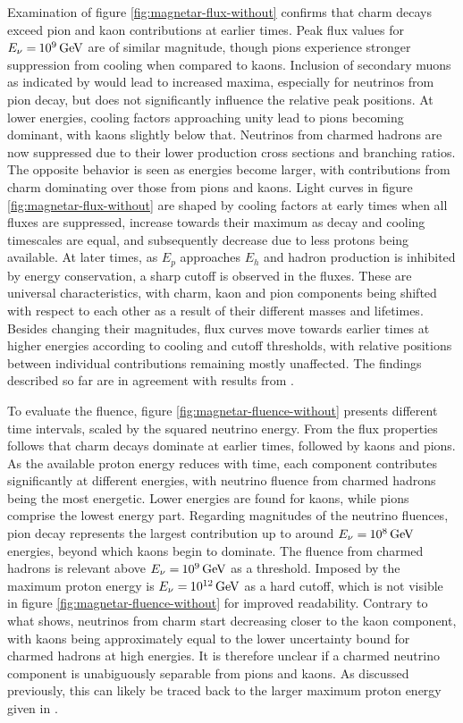 Examination of figure \ref{fig:magnetar-flux-without} confirms that charm decays exceed pion and kaon contributions at earlier times.
Peak flux values for $E_\nu = \kern-0.5pt \qty{e9}{\giga\electronvolt}$ are of similar magnitude, though pions experience stronger
suppression from cooling when compared to kaons. Inclusion of secondary muons as indicated by \cite{Carpio_2020} would
lead to increased maxima, especially for neutrinos from pion decay, but does not significantly influence the relative peak positions.
At lower energies, cooling factors approaching unity lead to pions becoming dominant, with kaons slightly below that. Neutrinos
from charmed hadrons are now suppressed due to their lower production cross sections and branching ratios. The opposite behavior
is seen as energies become larger, with contributions from charm dominating over those from pions and kaons. Light curves in figure
\ref{fig:magnetar-flux-without} are shaped by cooling factors at early times when all fluxes are suppressed, increase towards their
maximum as decay and cooling timescales are equal, and subsequently decrease due to less protons being available. At later times,
as $E_p$ approaches $E_h$ and hadron production is inhibited by energy conservation, a sharp cutoff is observed in the fluxes. These
are universal characteristics, with charm, kaon and pion components being shifted with respect to each other as a result of their
different masses and lifetimes. Besides changing their magnitudes, flux curves move towards earlier times at higher energies
according to cooling and cutoff thresholds, with relative positions between individual contributions remaining mostly unaffected. 
The findings described so far are in agreement with results from \cite{Carpio_2020}.

To evaluate the fluence, figure \ref{fig:magnetar-fluence-without} presents different time intervals, scaled by the squared neutrino
energy. From the flux properties follows that charm decays dominate at earlier times, followed by kaons and pions. As the available
proton energy reduces with time, each component contributes significantly at different energies, with neutrino fluence from
charmed hadrons being the most energetic. Lower energies are found for kaons, while pions comprise the lowest energy part.
Regarding magnitudes of the neutrino fluences, pion decay represents the largest contribution up to around
$E_\nu = \kern-0.5pt \smash{\qty{e8}{\giga\electronvolt}}$ energies, beyond which kaons begin to dominate. The fluence from
charmed hadrons is relevant above $E_\nu = \kern-0.5pt \smash{\qty{e9}{\giga\electronvolt}}$ as a threshold. Imposed by the maximum
proton energy is $E_\nu = \kern-0.5pt \smash{\qty{e12}{\giga\electronvolt}}$ as a hard cutoff, which is not visible in figure
\ref{fig:magnetar-fluence-without} for improved readability. Contrary to what \cite{Carpio_2020} shows, neutrinos from charm
start decreasing closer to the kaon component, with kaons being approximately equal to the lower uncertainty bound for charmed
hadrons at high energies. It is therefore unclear if a charmed neutrino component is unabiguously separable from pions and
kaons. As discussed previously, this can likely be traced back to the larger maximum proton energy given in \cite{Carpio_2020}.


\vspace{1.5\baselineskip}

